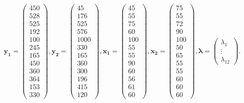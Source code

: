 \documentclass{article}
\begin{document}
$$
\boldsymbol{y_1} =
\begin{pmatrix}
  450 \\
  528 \\
  525 \\
  192 \\
  100 \\
  245 \\
  165 \\
  450 \\
  360 \\
  364 \\
  153 \\
  330 
\end{pmatrix}, 
\boldsymbol{y_2} =
\begin{pmatrix}
  45 \\
  176 \\
  525 \\
  576 \\
  1000 \\
  330 \\
  165 \\
  360 \\
  300 \\
  196 \\
  415 \\
  120
\end{pmatrix},
\boldsymbol{x_1} =
\begin{pmatrix}
  45 \\
  55 \\
  75 \\
  60 \\
  100 \\
  55 \\
  55 \\
  90 \\
  60 \\
  56 \\
  61 \\
  60
\end{pmatrix}, 
\boldsymbol{x_2} =
\begin{pmatrix}
  75 \\
  55 \\
  72 \\
  90 \\
  100 \\
  50 \\
  65 \\
  55 \\
  55 \\
  60 \\
  60 \\
  60
\end{pmatrix}, 
\boldsymbol{\lambda} = 
\begin{pmatrix}
  \lambda_1 \\
  \vdots \\
  \lambda_{12}
\end{pmatrix}.
$$
\end{document}

